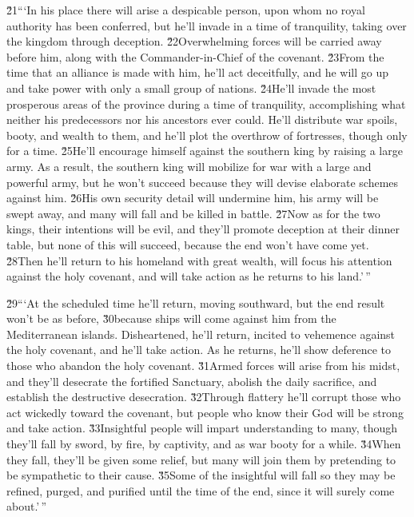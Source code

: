 \v{21}```In his place there will arise a despicable person, upon whom no royal authority has been conferred, but he'll invade in a time of tranquility, taking over the kingdom through deception. \v{22}Overwhelming forces will be carried away before him, along with the Commander-in-Chief of the covenant. \v{23}From the time that an alliance is made with him, he'll act deceitfully, and he will go up and take power with only a small group of nations. \v{24}He'll invade the most prosperous areas of the province during a time of tranquility, accomplishing what neither his predecessors nor his ancestors ever could. He'll distribute war spoils, booty, and wealth to them, and he'll plot the overthrow of fortresses, though only for a time. \v{25}He'll encourage himself against the southern king by raising a large army. As a result, the southern king will mobilize for war with a large and powerful army, but he won't succeed because they will devise elaborate schemes against him. \v{26}His own security detail will undermine him, his army will be swept away, and many will fall and be killed in battle. \v{27}Now as for the two kings, their intentions will be evil, and they'll promote deception at their dinner table, but none of this will succeed, because the end won't have come yet. \v{28}Then he'll return to his homeland with great wealth, will focus his attention against the holy covenant, and will take action as he returns to his land.'\,''

\v{29}```At the scheduled time he'll return, moving southward, but the end result won't be as before, \v{30}because ships will come against him from the Mediterranean islands. Disheartened, he'll return, incited to vehemence against the holy covenant, and he'll take action. As he returns, he'll show deference to those who abandon the holy covenant. \v{31}Armed forces will arise from his midst, and they'll desecrate the fortified Sanctuary, abolish the daily sacrifice, and establish the destructive desecration. \v{32}Through flattery he'll corrupt those who act wickedly toward the covenant, but people who know their God will be strong and take action. \v{33}Insightful people will impart understanding to many, though they'll fall by sword, by fire, by captivity, and as war booty for a while. \v{34}When they fall, they'll be given some relief, but many will join them by pretending to be sympathetic to their cause. \v{35}Some of the insightful will fall so they may be refined, purged, and purified until the time of the end, since it will surely come about.'\,''

